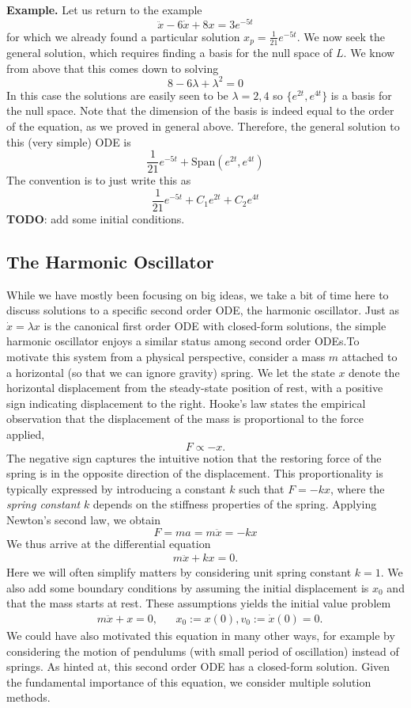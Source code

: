 \documentclass[12pt]{article}
\newcommand{\state}{x}
\begin{document}
\bigskip
\noindent
\textbf{Example.} Let us return to the example
\[\ddot{x} - 6\dot{x} + 8x = 3e^{-5t}\]
for which we already found a particular solution $x_p = \frac{1}{21} e^{-5t}$. We now seek the general solution, which requires finding a basis 
for the null space of $L$. We know from above that this comes down to solving 
\[8 - 6\lambda + \lambda^2 = 0\]
In this case the solutions are easily seen to be $\lambda = 2, 4$ so $\{e^{2t}, e^{4t}\}$ is a basis for the null space. Note that the dimension of the basis
is indeed equal to the order of the equation, as we proved in general above. Therefore, the general solution to this (very simple) ODE is 
\[\frac{1}{21} e^{-5t} + \text{Span}\left(e^{2t}, e^{4t}\right)\]
The convention is to just write this as 
\[\frac{1}{21} e^{-5t} + C_1 e^{2t} + C_2 e^{4t}  \]
\textbf{TODO}: add some initial conditions. 

\subsection{The Harmonic Oscillator}
While we have mostly been focusing on big ideas, we take a bit of time here to discuss solutions to a specific second order ODE, the harmonic oscillator. 
Just as $\dot{\state} = \lambda \state$ is the canonical first order ODE with closed-form solutions, the simple harmonic oscillator enjoys a similar status 
among second order ODEs.To motivate this system from a physical perspective, consider a mass $m$ attached to a horizontal (so that we can ignore 
gravity) spring. We let the state $\state$ denote the horizontal displacement from the steady-state position of rest, with a positive sign indicating displacement 
to the right. Hooke's law states the empirical observation that the displacement of the mass is proportional to the force applied,
\[F \propto -\state.\]
The negative sign captures the intuitive notion that the restoring force of the spring is in the opposite direction of the displacement. 
This proportionality is typically expressed by introducing a constant $k$ such that $F = -k \state$, where the \textit{spring constant} $k$ depends on the stiffness 
properties of the spring. Applying Newton's second law, we obtain 
\[F = ma = m\ddot{x} = -k \state\]
We thus arrive at the differential equation 
\begin{align}
m\ddot{x} + k \state = 0.
\end{align}
Here we will often simplify matters by considering unit spring constant $k = 1$. We also add some boundary conditions by assuming the initial 
displacement is $\state_0$ and that the mass starts at rest. These assumptions yields the initial value problem  
\begin{align}
&m \ddot{x} + \state = 0, && \state_0 := \state(0), v_0 := \dot{\state}(0) = 0. \label{harmonic_oscillator}
\end{align}
We could have also motivated this equation in many other ways, for example by considering the motion of pendulums (with small period of oscillation) instead of springs. 
As hinted at, this second order ODE has a closed-form solution. Given the fundamental importance of this equation, we consider multiple solution methods. 
\end{document}
